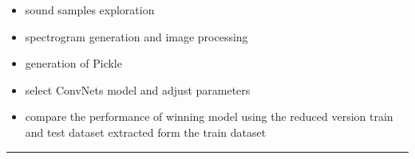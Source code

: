 \documentclass[]{article}
\begin{document}
\begin{itemize}
	\item sound samples exploration
	\item spectrogram generation and image processing
	\item generation of Pickle 
	\item select ConvNets model and adjust parameters
	\item compare the performance of winning model using the reduced version train and test dataset extracted form the train dataset
\end{itemize}
\begin{center}\rule{3in}{0.4pt}\end{center}

\end{document}
